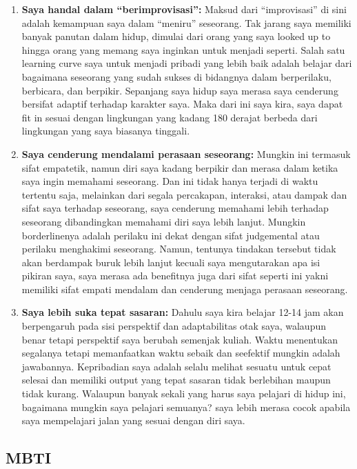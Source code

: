 \documentclass[
  letterpaper,
  DIV=11,
  numbers=noendperiod]{scrreprt}
\begin{document}
\begin{enumerate}
\def\labelenumi{\arabic{enumi}.}
\item
  \textbf{Saya handal dalam ``berimprovisasi'':} Maksud dari
  ``improvisasi'' di sini adalah kemampuan saya dalam ``meniru''
  seseorang. Tak jarang saya memiliki banyak panutan dalam hidup,
  dimulai dari orang yang saya looked up to hingga orang yang memang
  saya inginkan untuk menjadi seperti. Salah satu learning curve saya
  untuk menjadi pribadi yang lebih baik adalah belajar dari bagaimana
  seseorang yang sudah sukses di bidangnya dalam berperilaku, berbicara,
  dan berpikir. Sepanjang saya hidup saya merasa saya cenderung bersifat
  adaptif terhadap karakter saya. Maka dari ini saya kira, saya dapat
  fit in sesuai dengan lingkungan yang kadang 180 derajat berbeda dari
  lingkungan yang saya biasanya tinggali.
\item
  \textbf{Saya cenderung mendalami perasaan seseorang:} Mungkin ini
  termasuk sifat empatetik, namun diri saya kadang berpikir dan merasa
  dalam ketika saya ingin memahami seseorang. Dan ini tidak hanya
  terjadi di waktu tertentu saja, melainkan dari segala percakapan,
  interaksi, atau dampak dan sifat saya terhadap seseorang, saya
  cenderung memahami lebih terhadap seseorang dibandingkan memahami diri
  saya lebih lanjut. Mungkin borderlinenya adalah perilaku ini dekat
  dengan sifat judgemental atau perilaku menghakimi seseorang. Namun,
  tentunya tindakan tersebut tidak akan berdampak buruk lebih lanjut
  kecuali saya mengutarakan apa isi pikiran saya, saya merasa ada
  benefitnya juga dari sifat seperti ini yakni memiliki sifat empati
  mendalam dan cenderung menjaga perasaan seseorang.
\item
  \textbf{Saya lebih suka tepat sasaran:} Dahulu saya kira belajar 12-14
  jam akan berpengaruh pada sisi perspektif dan adaptabilitas otak saya,
  walaupun benar tetapi perspektif saya berubah semenjak kuliah. Waktu
  menentukan segalanya tetapi memanfaatkan waktu sebaik dan seefektif
  mungkin adalah jawabannya. Kepribadian saya adalah selalu melihat
  sesuatu untuk cepat selesai dan memiliki output yang tepat sasaran
  tidak berlebihan maupun tidak kurang. Walaupun banyak sekali yang
  harus saya pelajari di hidup ini, bagaimana mungkin saya pelajari
  semuanya? saya lebih merasa cocok apabila saya mempelajari jalan yang
  sesuai dengan diri saya.
\end{enumerate}

\subsection{MBTI}\label{mbti}
\end{document}
